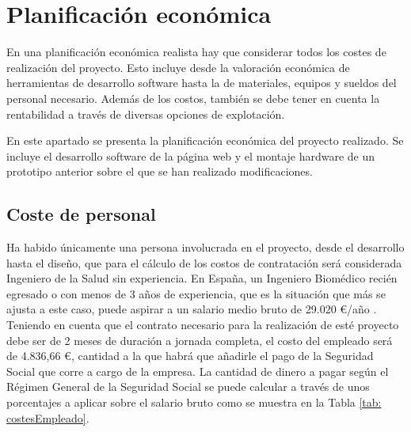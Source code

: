 \section{Planificación económica}
En una planificación económica realista hay que considerar todos los costes de realización del proyecto. Esto incluye desde la valoración económica de herramientas de desarrollo software hasta la de materiales, equipos y sueldos del personal necesario.
Además de los costos, también se debe tener en cuenta la rentabilidad a través de diversas opciones de explotación.

En este apartado se presenta la planificación económica del proyecto realizado. Se incluye el desarrollo software de la página web y el montaje hardware de un prototipo anterior sobre el que se han realizado modificaciones.

\subsection{Coste de personal}
Ha habido únicamente una persona involucrada en el proyecto, desde el desarrollo hasta el diseño, que para el cálculo de los costos de contratación será considerada Ingeniero de la Salud sin experiencia. 
En España, un Ingeniero Biomédico recién egresado o con menos de 3 años de experiencia, que es la situación que más se ajusta a este caso, puede aspirar a un salario medio bruto de 29.020 €/año \cite{jobtedIngenieroBiomedico}. Teniendo en cuenta que el contrato necesario para la realización de esté proyecto debe ser de 2 meses de duración a jornada completa, el costo del empleado será de 4.836,66 €, cantidad a la que habrá que añadirle el pago de la Seguridad Social que corre a cargo de la empresa. La cantidad de dinero a pagar según el Régimen General de la Seguridad Social \cite{SeguridaSocial:online} se puede calcular a través de unos porcentajes a aplicar sobre el salario bruto como se muestra en la Tabla \ref{tab: costesEmpleado}.

